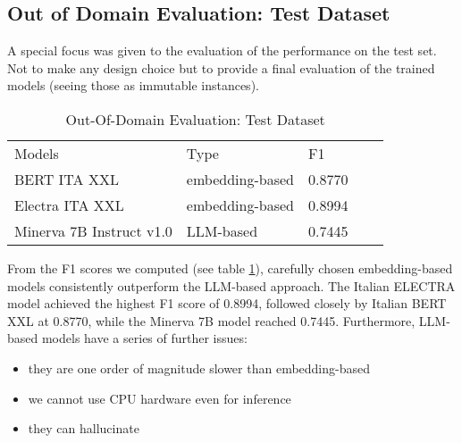 \documentclass[11pt]{article}
\begin{document}
\subsection{Out of Domain Evaluation: Test Dataset}
A special focus was given to the evaluation of the performance on the test set.
Not to make any design choice but to provide a final evaluation of the 
trained models (seeing those as immutable instances).
\begin{table}[]
	\small
	\caption{Out-Of-Domain Evaluation: Test Dataset}
	\begin{tabular}{lllll}
		Models & Type & F1 \\
		BERT ITA XXL & embedding-based & 0.8770 \\
		Electra ITA XXL & embedding-based & 0.8994 \\
		Minerva 7B Instruct v1.0 & LLM-based & 0.7445 \\
	\end{tabular}
	\label{t3}
\end{table}
From the F1 scores we computed (see table \ref{t3}), carefully chosen embedding-based models consistently outperform the LLM-based approach. \newline The Italian ELECTRA model achieved the highest F1 score of 0.8994, followed closely by Italian BERT XXL at 0.8770, while the Minerva 7B model reached 0.7445. \newline
Furthermore, LLM-based models have a series of further issues:

\begin{itemize}
 	\item they are one order of magnitude slower than embedding-based
	\item we cannot use CPU hardware even for inference
	\item they can hallucinate
\end{itemize}
\end{document}
